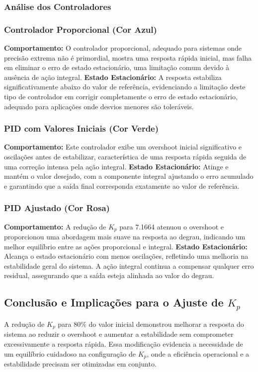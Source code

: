 \subsubsection{Análise dos Controladores}

\subsubsection{Controlador Proporcional (Cor Azul)}
\textbf{Comportamento:} O controlador proporcional, adequado para sistemas onde precisão extrema não é primordial, mostra uma resposta rápida inicial, mas falha em eliminar o erro de estado estacionário, uma limitação comum devido à ausência de ação integral.
\textbf{Estado Estacionário:} A resposta estabiliza significativamente abaixo do valor de referência, evidenciando a limitação deste tipo de controlador em corrigir completamente o erro de estado estacionário, adequado para aplicações onde desvios menores são toleráveis.

\subsubsection{PID com Valores Iniciais (Cor Verde)}
\textbf{Comportamento:} Este controlador exibe um overshoot inicial significativo e oscilações antes de estabilizar, característica de uma resposta rápida seguida de uma correção intensa pela ação integral.
\textbf{Estado Estacionário:} Atinge e mantém o valor desejado, com a componente integral ajustando o erro acumulado e garantindo que a saída final corresponda exatamente ao valor de referência.

\subsubsection{PID Ajustado (Cor Rosa)}
\textbf{Comportamento:} A redução de \(K_p\) para 7.1664 atenuou o overshoot e proporcionou uma abordagem mais suave na resposta ao degrau, indicando um melhor equilíbrio entre as ações proporcional e integral.
\textbf{Estado Estacionário:} Alcança o estado estacionário com menos oscilações, refletindo uma melhoria na estabilidade geral do sistema. A ação integral continua a compensar qualquer erro residual, assegurando que a saída esteja alinhada ao valor do degrau.

\subsection{Conclusão e Implicações para o Ajuste de \(K_p\)}
A redução de \(K_p\) para 80\% do valor inicial demonstrou melhorar a resposta do sistema ao reduzir o overshoot e aumentar a estabilidade sem comprometer excessivamente a resposta rápida. Essa modificação evidencia a necessidade de um equilíbrio cuidadoso na configuração de \(K_p\), onde a eficiência operacional e a estabilidade precisam ser otimizadas em conjunto.

